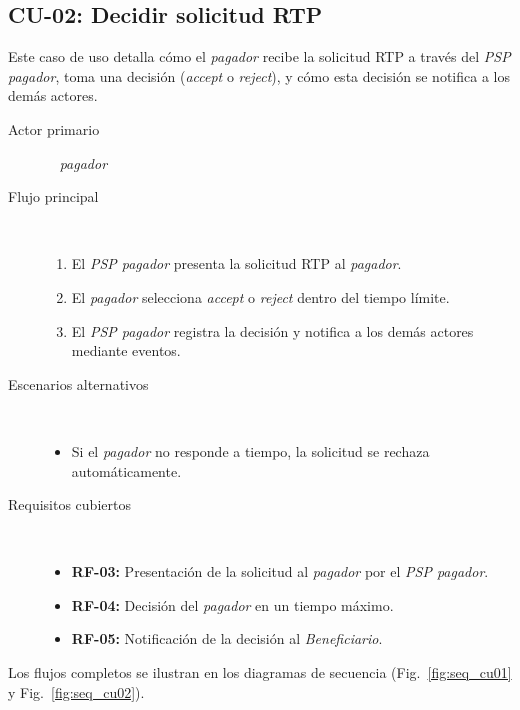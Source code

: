 \subsection{CU-02: Decidir solicitud RTP}
Este caso de uso detalla cómo el \textit{pagador} recibe la solicitud RTP a través del \textit{PSP pagador}, toma una decisión (\textit{accept} o \textit{reject}), y cómo esta decisión se notifica a los demás actores.
\begin{description}
  \item[Actor primario] ~ \textit{pagador}
  \item[Flujo principal] ~
    \begin{enumerate}
      \item El \textit{PSP pagador} presenta la solicitud RTP al \textit{pagador}.
      \item El \textit{pagador} selecciona \textit{accept} o \textit{reject} dentro del tiempo límite.
      \item El \textit{PSP pagador} registra la decisión y notifica a los demás actores mediante eventos.
    \end{enumerate}
  \item[Escenarios alternativos] ~
    \begin{itemize}
      \item Si el \textit{pagador} no responde a tiempo, la solicitud se rechaza automáticamente.
    \end{itemize}
  \item[Requisitos cubiertos] ~
    \begin{itemize}
      \item \textbf{RF-03:} Presentación de la solicitud al \textit{pagador} por el \textit{PSP pagador}.
      \item \textbf{RF-04:} Decisión del \textit{pagador} en un tiempo máximo.
      \item \textbf{RF-05:} Notificación de la decisión al \textit{Beneficiario}.
    \end{itemize}
\end{description}

Los flujos completos se ilustran en los diagramas de secuencia (Fig.~\ref{fig:seq_cu01} y Fig.~\ref{fig:seq_cu02}).

